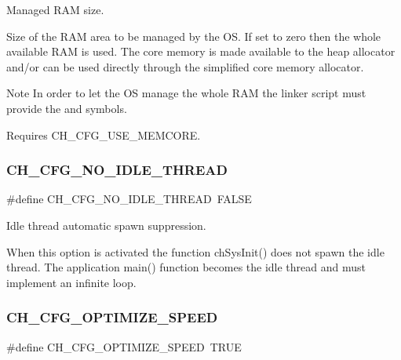 Managed R\+AM size. 

Size of the R\+AM area to be managed by the OS. If set to zero then the whole available R\+AM is used. The core memory is made available to the heap allocator and/or can be used directly through the simplified core memory allocator.

\begin{DoxyNote}{Note}
In order to let the OS manage the whole R\+AM the linker script must provide the {} and {} symbols. 

Requires {\ttfamily C\+H\+\_\+\+C\+F\+G\+\_\+\+U\+S\+E\+\_\+\+M\+E\+M\+C\+O\+RE}. 
\end{DoxyNote}
\hypertarget{group__config_ga8c0d4e5b775c997167737f0ca65eb11e}{}\label{group__config_ga8c0d4e5b775c997167737f0ca65eb11e} 
\subsubsection{\texorpdfstring{C\+H\+\_\+\+C\+F\+G\+\_\+\+N\+O\+\_\+\+I\+D\+L\+E\+\_\+\+T\+H\+R\+E\+AD}{CH\_CFG\_NO\_IDLE\_THREAD}}
{\footnotesize\ttfamily \#define C\+H\+\_\+\+C\+F\+G\+\_\+\+N\+O\+\_\+\+I\+D\+L\+E\+\_\+\+T\+H\+R\+E\+AD~F\+A\+L\+SE}



Idle thread automatic spawn suppression. 

When this option is activated the function {\ttfamily ch\+Sys\+Init()} does not spawn the idle thread. The application {\ttfamily main()} function becomes the idle thread and must implement an infinite loop. \hypertarget{group__config_gac7a7942b6c4ef2f79416971688a49c40}{}\label{group__config_gac7a7942b6c4ef2f79416971688a49c40} 
\subsubsection{\texorpdfstring{C\+H\+\_\+\+C\+F\+G\+\_\+\+O\+P\+T\+I\+M\+I\+Z\+E\+\_\+\+S\+P\+E\+ED}{CH\_CFG\_OPTIMIZE\_SPEED}}
{\footnotesize\ttfamily \#define C\+H\+\_\+\+C\+F\+G\+\_\+\+O\+P\+T\+I\+M\+I\+Z\+E\+\_\+\+S\+P\+E\+ED~T\+R\+UE}



